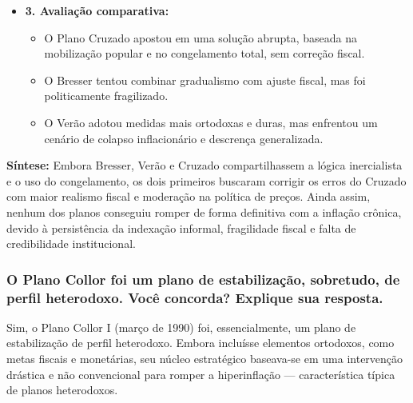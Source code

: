 \documentclass[a4paper,12pt]{article}[abntex2]
\begin{document}
\begin{itemize}
    \item \textbf{3. Avaliação comparativa:}
    \begin{itemize}
        \item O Plano Cruzado apostou em uma solução abrupta, baseada na mobilização popular e no congelamento total, sem correção fiscal.
        \item O Bresser tentou combinar gradualismo com ajuste fiscal, mas foi politicamente fragilizado.
        \item O Verão adotou medidas mais ortodoxas e duras, mas enfrentou um cenário de colapso inflacionário e descrença generalizada.
    \end{itemize}
\end{itemize}

\textbf{Síntese:} Embora Bresser, Verão e Cruzado compartilhassem a lógica inercialista e o uso do congelamento, os dois primeiros buscaram corrigir os erros do Cruzado com maior realismo fiscal e moderação na política de preços. Ainda assim, nenhum dos planos conseguiu romper de forma definitiva com a inflação crônica, devido à persistência da indexação informal, fragilidade fiscal e falta de credibilidade institucional.

\subsubsection{\textbf{O Plano Collor foi um plano de estabilização, sobretudo, de perfil heterodoxo. Você concorda? Explique sua resposta.}}

Sim, o Plano Collor I (março de 1990) foi, essencialmente, um plano de estabilização de perfil heterodoxo. Embora incluísse elementos ortodoxos, como metas fiscais e monetárias, seu núcleo estratégico baseava-se em uma intervenção drástica e não convencional para romper a hiperinflação — característica típica de planos heterodoxos.
\end{document}
